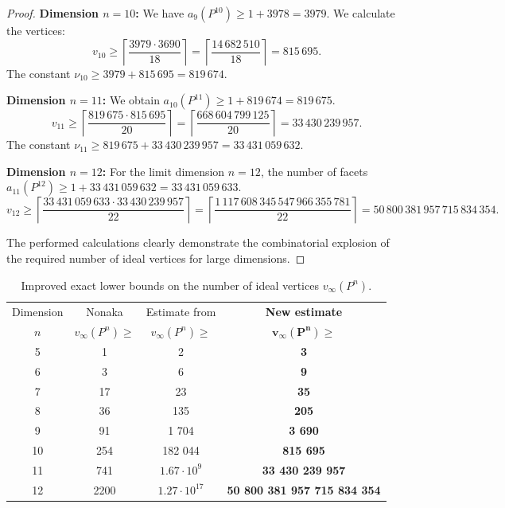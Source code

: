 \documentclass[12pt]{amsart}
\theoremstyle{definition}
\begin{document}
\begin{proof}
		\textbf{Dimension $n=10$:} We have $a_9(P^{10}) \ge 1 + 3978 = 3979$. We calculate the vertices:
		$$v_{10} \ge \left\lceil \frac{3979 \cdot 3690}{18} \right\rceil = \left\lceil \frac{14\,682\,510}{18} \right\rceil = 815\,695.$$
		The constant $\nu_{10} \ge 3979 + 815\,695 = 819\,674$.
		
		\textbf{Dimension $n=11$:} We obtain $a_{10}(P^{11}) \ge 1 + 819\,674 = 819\,675$.
		$$v_{11} \ge \left\lceil \frac{819\,675 \cdot 815\,695}{20} \right\rceil = \left\lceil \frac{668\,604\,799\,125}{20} \right\rceil = 33\,430\,239\,957.$$
		The constant $\nu_{11} \ge 819\,675 + 33\,430\,239\,957 = 33\,431\,059\,632$.
		
		\textbf{Dimension $n=12$:} For the limit dimension $n=12$, the number of facets $a_{11}(P^{12}) \ge 1 + 33\,431\,059\,632 = 33\,431\,059\,633$.
		$$v_{12} \ge \left\lceil \frac{33\,431\,059\,633 \cdot 33\,430\,239\,957}{22} \right\rceil = \left\lceil \frac{1\,117\,608\,345\,547\,966\,355\,781}{22} \right\rceil = 50\,800\,381\,957\,715\,834\,354.$$
		
		The performed calculations clearly demonstrate the combinatorial explosion of the required number of ideal vertices for large dimensions.
	\end{proof}
	
	\begin{table}[h]
		\centering
		\renewcommand{\arraystretch}{1.4}
		\begin{tabular}{|c|c|c|c|}
			\hline
			Dimension & Nonaka \cite{Nonaka} & Estimate from \cite{Ale23} & \textbf{New estimate} \\
			$n$ & $v_\infty(P^n) \ge$ & $v_\infty(P^n) \ge$ & $\mathbf{v_\infty(P^n) \ge}$ \\
			\hline
			5 & 1 & 2 & \textbf{3} \\
			6 & 3 & 6 & \textbf{9} \\
			7 & 17 & 23 & \textbf{35} \\
			8 & 36 & 135 & \textbf{205} \\
			9 & 91 & 1 704 & \textbf{3 690} \\
			10 & 254 & 182 044 & \textbf{815 695} \\
			11 & 741 & $1.67 \cdot 10^9$ & \textbf{33 430 239 957} \\
			12 & 2200 & $1.27 \cdot 10^{17}$ & \textbf{50 800 381 957 715 834 354} \\
			\hline
		\end{tabular}
		\caption{Improved exact lower bounds on the number of ideal vertices $v_\infty(P^n)$.}
		\label{tab:comparison}
	\end{table}
	
\end{document}
